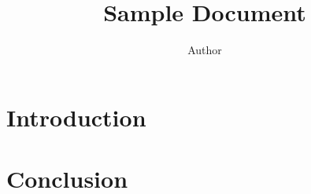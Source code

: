 \documentclass{article}
\title{Sample Document}
\author{Author}
\date{}
\begin{document}
    \maketitle

    \section{Introduction}
    \subsection{}
    \subsection{}
    \section{Conclusion}
\end{document}
